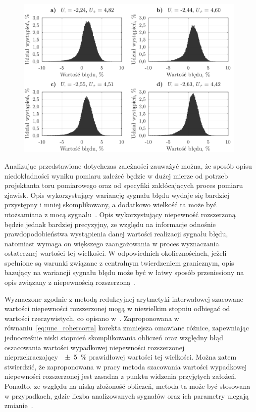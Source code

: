 \begin{figure}[htb!]
\begin{center}
\includegraphics{obrazki/hist_reductive}
\end{center}
\end{figure}

Analizując przedstawione dotychczas zależności zauważyć można, że sposób opisu niedokładności wyniku pomiaru zależeć będzie w dużej mierze od potrzeb projektanta toru pomiarowego oraz od specyfiki zakłócających proces pomiaru zjawisk. Opis wykorzystujący wariancję sygnału błędu wydaje się bardziej przystępny i mniej skomplikowany, a dodatkowo wielkość ta może być utożsamiana z mocą sygnału~\cite{proakis_dsp}. Opis wykorzystujący niepewność rozszerzoną będzie jednak bardziej precyzyjny, ze względu na informacje odnośnie prawdopodobieństwa wystąpienia danej wartości realizacji sygnału błędu, natomiast wymaga on większego zaangażowania w proces wyznaczania ostatecznej wartości tej wielkości. W odpowiednich okolicznościach, jeżeli spełnione są warunki związane z centralnym twierdzeniem granicznym, opis bazujący na wariancji sygnału błędu może być w łatwy sposób przeniesiony na opis związany z niepewnością rozszerzoną~\cite{jcgm_guide}.

Wyznaczone zgodnie z metodą redukcyjnej arytmetyki interwałowej szacowane wartości niepewności rozszerzonej mogą w niewielkim stopniu odbiegać od wartości rzeczywistych, co opisano w~\cite{jakubiec_redmono, jakubiec_model}. Zaproponowana w równaniu~\eqref{eq:unc_cohercorra} korekta zmniejsza omawiane różnice, zapewniając jednocześnie niski stopnień skomplikowania obliczeń oraz względny błąd oszacowania wartości wypadkowej niepewności rozszerzonej nieprzekraczający~\qty{\pm 5}{\percent} prawidłowej wartości tej wielkości. Można zatem stwierdzić, że zaproponowana w pracy metoda szacowania wartości wypadkowej niepewności rozszerzonej jest zasadna z punktu widzenia przyjętych założeń. Ponadto, ze względu na niską złożoność obliczeń, metoda ta może być stosowana w przypadkach, gdzie liczba analizowanych sygnałów oraz ich parametry ulegają zmianie~\cite{auth_reductive}.

